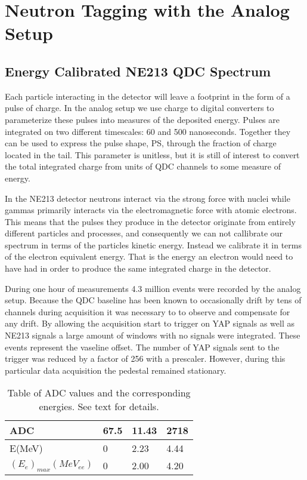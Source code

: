 \documentclass[main.tex]{subfiles}
\begin{document}
\section{Neutron Tagging with the Analog Setup}
\subsection{Energy Calibrated NE213 QDC Spectrum}
Each particle interacting in the detector will leave a footprint in the form of a pulse of charge. In the analog setup we use charge to digital converters to parameterize these pulses into measures of the deposited energy. Pulses are integrated on two different timescales: 60 and 500 nanoseconds. Together they can be used to express the pulse shape, PS, through the fraction of charge located in the tail. This parameter is unitless, but it is still of interest to convert the total integrated charge from units of QDC channels to some measure of energy.

In the NE213 detector neutrons interact via the strong force with nuclei while gammas primarily interacts via the electromagnetic force with atomic electrons. This means that the pulses they produce in the detector originate from entirely different particles and processes, and consequently we can not callibrate our spectrum in terms of the particles kinetic energy. Instead we calibrate it in terms of the electron equivalent energy. That is the energy an electron would need to have had in order to produce the same integrated charge in the detector.

During one hour of measurements 4.3 million events were recorded by the analog setup. Because the QDC baseline has been known to occasionally drift by tens of channels during acquisition it was necessary to to observe and compensate for any drift. By allowing the acquisition start to trigger on YAP signals as well as NE213 signals a large amount of windows with no signals were integrated. These events represent the vaseline offset. The number of YAP signals sent to the trigger was reduced by a factor of 256 with a prescaler. However, during this particular data acquisition the pedestal remained stationary.

\begin{table}[hb]
	\center
	\begin{tabular}{|l|l|l|l|}
	\hline
	ADC             & 67.5 & 11.43 & 2718 \\
	\hline
	E(MeV)          & 0    & 2.23  & 4.44 \\
	\hline
	$(E_{e})_{max}(MeV_{ee})$ & 0    & 2.00  & 4.20 \\
	\hline
	\end{tabular}
   	\captionsetup{width=0.435\linewidth}
	\caption{Table of ADC values and the corresponding energies. See text for details.}
	\label{tab:knox}
\end{table}
\end{document}
